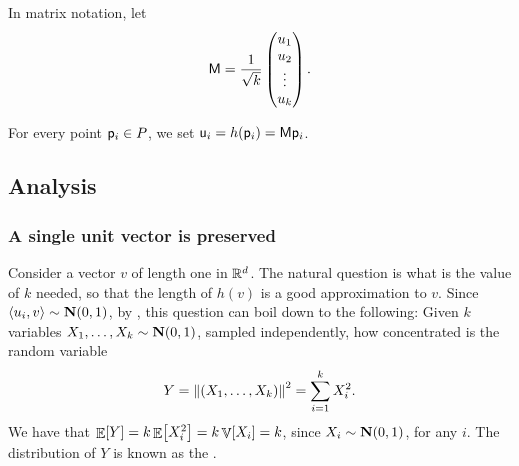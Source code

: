 In matrix notation, let
\begin{equation*}
    \mathsf{M} = \frac{1}{\sqrt{k}} 
    \begin{pmatrix} u_1\\ u_2\\ \vdots\\ u_k
        \end{pmatrix}.    
\end{equation*}

For every point $\mathsf{p}_i \in P$, we set
$\mathsf{u}_i = h(\mathsf{p}_i) = \mathsf{M} \mathsf{p}_i$.


\subsection{Analysis}

\subsubsection{A single unit vector is preserved}




Consider a vector $v$ of length one in $\mathbb{R}^d$. The natural
question is what is the value of $k$ needed, so that the length of
$h(v)$ is a good approximation to $v$.  Since
$\DotProd{u_i}{v} \sim \NormalY{0}{1}$, by
, this question can boil down to the
following: Given $k$ variables $X_1, \ldots, X_k \sim \NormalY{0}{1}$,
sampled independently, how concentrated is the random variable
\begin{equation*}
    Y%
    =%
    \norm{(X_1, \ldots, X_k)}^2%
    =%
    \sum_{i=1}^k X_i^2.
\end{equation*}
We have that $\mathop{\mathbb{E}}\!\left[ {Y} \right] = k \mathop{\mathbb{E}}\!\left[ {X_i^2} \right] = k \mathop{\mathbb{V}}\!\left[ {X_i} \right] = k$, since
$X_i \sim \NormalY{0}{1}$, for any $i$. The distribution of $Y$ is
known as the .

